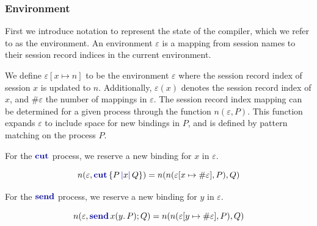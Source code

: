 





\subsubsection{Environment}

First we introduce notation to represent the state of the compiler, which we refer to as the environment. An environment $\varepsilon$ is a mapping from session names to their session record indices in the current environment.

We define $\varepsilon[x \mapsto n]$ to be the environment $\varepsilon$ where the session record index of session $x$ is updated to $n$. Additionally, $\varepsilon(x)$ denotes the session record index of $x$, and $\#\varepsilon$ the number of mappings in $\varepsilon$.
The session record index mapping can be determined for a given process through the function $n(\varepsilon, P)$. This function expands $\varepsilon$ to include space for new bindings in $P$, and is defined by pattern matching on the process $P$.

For the $\cutp$ process, we reserve a new binding for $x$ in $\varepsilon$.

$$
    n(\varepsilon, \cutc{P}{x}{Q}) = n(n(\varepsilon[x \mapsto \#\varepsilon], P), Q)
$$

For the $\sendp$ process, we reserve a new binding for $y$ in $\varepsilon$.

$$
    n(\varepsilon, \sendc{x}{y}{P}{Q}) = n(n(\varepsilon[y \mapsto \#\varepsilon], P), Q)
$$

